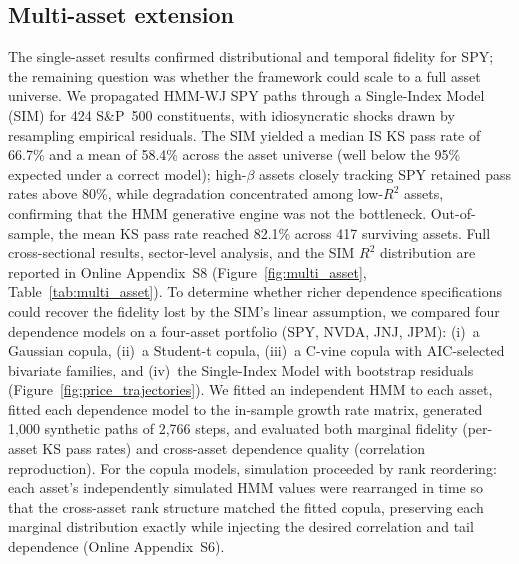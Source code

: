\subsection{Multi-asset extension}
The single-asset results confirmed distributional and temporal fidelity for SPY; the remaining question was whether the framework could scale to a full asset universe. We propagated HMM-WJ SPY paths through a Single-Index Model (SIM) for 424 S\&P~500 constituents, with idiosyncratic shocks drawn by resampling empirical residuals. The SIM yielded a median IS KS pass rate of 66.7\% and a mean of 58.4\% across the asset universe (well below the 95\% expected under a correct model); high-$\beta$ assets closely tracking SPY retained pass rates above 80\%, while degradation concentrated among low-$R^2$ assets, confirming that the HMM generative engine was not the bottleneck. Out-of-sample, the mean KS pass rate reached 82.1\% across 417 surviving assets. Full cross-sectional results, sector-level analysis, and the SIM $R^2$ distribution are reported in Online Appendix~S8 (Figure~\ref{fig:multi_asset}, Table~\ref{tab:multi_asset}). To determine whether richer dependence specifications could recover the fidelity lost by the SIM's linear assumption, we compared four dependence models on a four-asset portfolio (SPY, NVDA, JNJ, JPM): (i)~a Gaussian copula, (ii)~a Student-t copula, (iii)~a C-vine copula with AIC-selected bivariate families, and (iv)~the Single-Index Model with bootstrap residuals (Figure~\ref{fig:price_trajectories}). We fitted an independent HMM to each asset, fitted each dependence model to the in-sample growth rate matrix, generated 1,000 synthetic paths of 2,766 steps, and evaluated both marginal fidelity (per-asset KS pass rates) and cross-asset dependence quality (correlation reproduction). For the copula models, simulation proceeded by rank reordering: each asset's independently simulated HMM values were rearranged in time so that the cross-asset rank structure matched the fitted copula, preserving each marginal distribution exactly while injecting the desired correlation and tail dependence (Online Appendix~S6).


